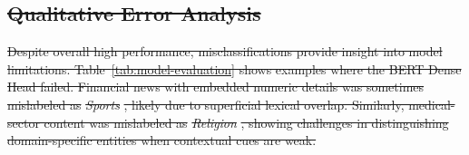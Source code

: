 \documentclass[preprint,12pt,authoryear]{elsarticle}
\newcommand{\RTL}[1]{\foreignlanguage{arabic}{#1}} %
\providecommand{\DIFdel}[1]{{\protect\color{red}\sout{#1}}}                      %
\providecommand{\DIFdelbegin}{} %
\begin{document}
\DIFdelbegin %

\subsection{\DIFdel{Qualitative Error Analysis}}
\addtocounter{subsection}{-1}%

\DIFdel{Despite overall high performance, misclassifications provide insight into model limitations. Table~\ref{tab:model-evaluation} shows examples where the BERT Dense Head failed. Financial news with embedded numeric details was sometimes mislabeled as }\textit{\DIFdel{Sports}}%
\DIFdel{, likely due to superficial lexical overlap. Similarly, medical-sector content was mislabeled as }\textit{\DIFdel{Religion}}%
\DIFdel{, showing challenges in distinguishing domain-specific entities when contextual cues are weak.
}%

\end{document}
